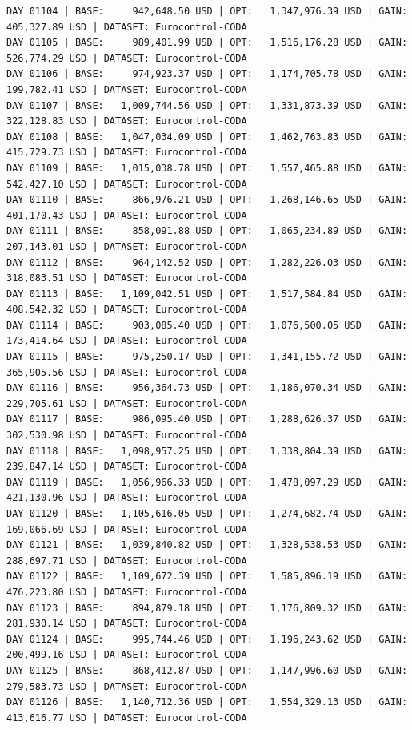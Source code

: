 \documentclass[11pt,a4paper]{article}
\begin{document}
\begin{verbatim}
DAY 01104 | BASE:     942,648.50 USD | OPT:   1,347,976.39 USD | GAIN: 405,327.89 USD | DATASET: Eurocontrol-CODA
DAY 01105 | BASE:     989,401.99 USD | OPT:   1,516,176.28 USD | GAIN: 526,774.29 USD | DATASET: Eurocontrol-CODA
DAY 01106 | BASE:     974,923.37 USD | OPT:   1,174,705.78 USD | GAIN: 199,782.41 USD | DATASET: Eurocontrol-CODA
DAY 01107 | BASE:   1,009,744.56 USD | OPT:   1,331,873.39 USD | GAIN: 322,128.83 USD | DATASET: Eurocontrol-CODA
DAY 01108 | BASE:   1,047,034.09 USD | OPT:   1,462,763.83 USD | GAIN: 415,729.73 USD | DATASET: Eurocontrol-CODA
DAY 01109 | BASE:   1,015,038.78 USD | OPT:   1,557,465.88 USD | GAIN: 542,427.10 USD | DATASET: Eurocontrol-CODA
DAY 01110 | BASE:     866,976.21 USD | OPT:   1,268,146.65 USD | GAIN: 401,170.43 USD | DATASET: Eurocontrol-CODA
DAY 01111 | BASE:     858,091.88 USD | OPT:   1,065,234.89 USD | GAIN: 207,143.01 USD | DATASET: Eurocontrol-CODA
DAY 01112 | BASE:     964,142.52 USD | OPT:   1,282,226.03 USD | GAIN: 318,083.51 USD | DATASET: Eurocontrol-CODA
DAY 01113 | BASE:   1,109,042.51 USD | OPT:   1,517,584.84 USD | GAIN: 408,542.32 USD | DATASET: Eurocontrol-CODA
DAY 01114 | BASE:     903,085.40 USD | OPT:   1,076,500.05 USD | GAIN: 173,414.64 USD | DATASET: Eurocontrol-CODA
DAY 01115 | BASE:     975,250.17 USD | OPT:   1,341,155.72 USD | GAIN: 365,905.56 USD | DATASET: Eurocontrol-CODA
DAY 01116 | BASE:     956,364.73 USD | OPT:   1,186,070.34 USD | GAIN: 229,705.61 USD | DATASET: Eurocontrol-CODA
DAY 01117 | BASE:     986,095.40 USD | OPT:   1,288,626.37 USD | GAIN: 302,530.98 USD | DATASET: Eurocontrol-CODA
DAY 01118 | BASE:   1,098,957.25 USD | OPT:   1,338,804.39 USD | GAIN: 239,847.14 USD | DATASET: Eurocontrol-CODA
DAY 01119 | BASE:   1,056,966.33 USD | OPT:   1,478,097.29 USD | GAIN: 421,130.96 USD | DATASET: Eurocontrol-CODA
DAY 01120 | BASE:   1,105,616.05 USD | OPT:   1,274,682.74 USD | GAIN: 169,066.69 USD | DATASET: Eurocontrol-CODA
DAY 01121 | BASE:   1,039,840.82 USD | OPT:   1,328,538.53 USD | GAIN: 288,697.71 USD | DATASET: Eurocontrol-CODA
DAY 01122 | BASE:   1,109,672.39 USD | OPT:   1,585,896.19 USD | GAIN: 476,223.80 USD | DATASET: Eurocontrol-CODA
DAY 01123 | BASE:     894,879.18 USD | OPT:   1,176,809.32 USD | GAIN: 281,930.14 USD | DATASET: Eurocontrol-CODA
DAY 01124 | BASE:     995,744.46 USD | OPT:   1,196,243.62 USD | GAIN: 200,499.16 USD | DATASET: Eurocontrol-CODA
DAY 01125 | BASE:     868,412.87 USD | OPT:   1,147,996.60 USD | GAIN: 279,583.73 USD | DATASET: Eurocontrol-CODA
DAY 01126 | BASE:   1,140,712.36 USD | OPT:   1,554,329.13 USD | GAIN: 413,616.77 USD | DATASET: Eurocontrol-CODA

\end{verbatim}
\end{document}
